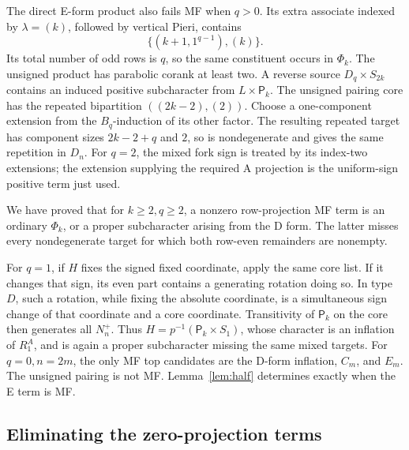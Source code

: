 \documentclass[11pt]{article}
\numberwithin{equation}{section}
\theoremstyle{definition}
\newcommand{\pair}{\mathsf P}
\begin{document}
The direct E-form product also fails MF when \(q>0\).
Its extra associate indexed by \(\lambda=(k)\), followed by vertical Pieri, contains
\[
 \{(k+1,1^{q-1}),(k)\}.
\]
Its total number of odd rows is \(q\), so the same constituent occurs in \(\Phi_k\).
The unsigned product has parabolic corank at least two.
A reverse source \(D_q\times S_{2k}\) contains an induced positive subcharacter from \(L\times\pair_k\).
The unsigned pairing core has the repeated bipartition \(((2k-2),(2))\).
Choose a one-component extension from the \(B_q\)-induction of its other factor.
The resulting repeated target has component sizes \(2k-2+q\) and \(2\), so is nondegenerate and gives the same repetition in \(D_n\).
For \(q=2\), the mixed fork sign is treated by its index-two extensions; the extension supplying the required A projection is the uniform-sign positive term just used.

We have proved that for \(k\geq2,q\geq2\), a nonzero row-projection MF term is an ordinary \(\Phi_k\), or a proper subcharacter arising from the D form.
The latter misses every nondegenerate target for which both row-even remainders are nonempty.

For \(q=1\), if \(H\) fixes the signed fixed coordinate, apply the same core list.
If it changes that sign, its even part contains a generating rotation doing so.
In type \(D\), such a rotation, while fixing the absolute coordinate, is a simultaneous sign change of that coordinate and a core coordinate.
Transitivity of \(\pair_k\) on the core then generates all \(N_n^+\).
Thus \(H=p^{-1}(\pair_k\times S_1)\), whose character is an inflation of \(R_1^A\), and is again a proper subcharacter missing the same mixed targets.
For \(q=0,n=2m\), the only MF top candidates are the D-form inflation, \(C_m\), and \(E_m\).
The unsigned pairing is not MF.
Lemma~\ref{lem:half} determines exactly when the E term is MF.

\subsection{Eliminating the zero-projection terms}
\end{document}
